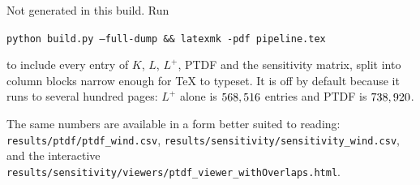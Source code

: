 \documentclass[11pt,a4paper]{article}
\newcommand{\Lp}{L^{+}}
\begin{document}
\ifdefined\fulldump
  
  
  
  
  
\else
  Not generated in this build. Run
  \medskip

  \texttt{python build.py --full-dump \&\& latexmk -pdf pipeline.tex}
  \medskip

  \noindent to include every entry of $K$, $L$, $\Lp$, PTDF and the sensitivity
  matrix, split into column blocks narrow enough for \TeX{} to typeset. It is
  off by default because it runs to several hundred pages: $\Lp$ alone is
  $568,516$ entries and PTDF is $738,920$.

  \medskip
  \noindent The same numbers are available in a form better suited to reading:
  \texttt{results/ptdf/ptdf\_wind.csv},
  \texttt{results/sensitivity/sensitivity\_wind.csv}, and the interactive
  \texttt{results/sensitivity/viewers/ptdf\_viewer\_withOverlaps.html}.
\fi
\end{document}
